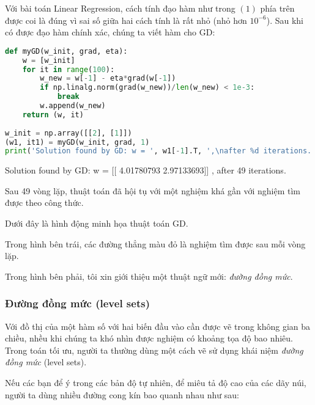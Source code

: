 Với bài toán Linear Regression, cách tính đạo hàm như trong $(1)$ phía trên được coi là đúng vì sai số giữa hai cách tính là rất nhỏ (nhỏ hơn $10^{-6}$). Sau khi có được đạo hàm chính xác, chúng ta viết hàm cho GD: 
 
 
\begin{lstlisting}[language=Python]
def myGD(w_init, grad, eta): 
    w = [w_init] 
    for it in range(100): 
        w_new = w[-1] - eta*grad(w[-1]) 
        if np.linalg.norm(grad(w_new))/len(w_new) < 1e-3: 
            break  
        w.append(w_new) 
    return (w, it)  
 
w_init = np.array([[2], [1]]) 
(w1, it1) = myGD(w_init, grad, 1) 
print('Solution found by GD: w = ', w1[-1].T, ',\nafter %d iterations.' %(it1+1)) 
\end{lstlisting}
 
    Solution found by GD: w =  [[ 4.01780793  2.97133693]] , 
    after 49 iterations. 
 
 
Sau 49 vòng lặp, thuật toán đã hội tụ với một nghiệm khá gần với nghiệm tìm được theo công thức.  
 
Dưới đây là hình động minh họa thuật toán GD. 
 
 
 
 
Trong hình bên trái, các đường thẳng màu đỏ là nghiệm tìm được sau mỗi vòng lặp.  
 
Trong hình bên phải, tôi xin giới thiệu một thuật ngữ mới: \textit{đường đồng mức}. 
 
\subsubsection{Đường đồng mức (level sets)}
Với đồ thị của một hàm số với hai biến đầu vào cần được vẽ trong không gian ba chiều, nhều khi chúng ta khó nhìn được nghiệm có khoảng tọa độ bao nhiêu. Trong toán tối ưu, người ta thường dùng một cách vẽ sử dụng khái niệm \textit{đường đồng mức} (level sets).  
 
Nếu các bạn để ý trong các bản độ tự nhiên, để miêu tả độ cao của các dãy núi, người ta dùng nhiều đường cong kín bao quanh nhau như sau: 
 
